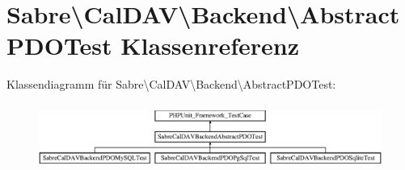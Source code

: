 \hypertarget{class_sabre_1_1_cal_d_a_v_1_1_backend_1_1_abstract_p_d_o_test}{}\section{Sabre\textbackslash{}Cal\+D\+AV\textbackslash{}Backend\textbackslash{}Abstract\+P\+D\+O\+Test Klassenreferenz}
\label{class_sabre_1_1_cal_d_a_v_1_1_backend_1_1_abstract_p_d_o_test}
Klassendiagramm für Sabre\textbackslash{}Cal\+D\+AV\textbackslash{}Backend\textbackslash{}Abstract\+P\+D\+O\+Test\+:\begin{figure}[H]
\begin{center}
\leavevmode
\includegraphics[height=2.170543cm]{class_sabre_1_1_cal_d_a_v_1_1_backend_1_1_abstract_p_d_o_test}
\end{center}
\end{figure}
